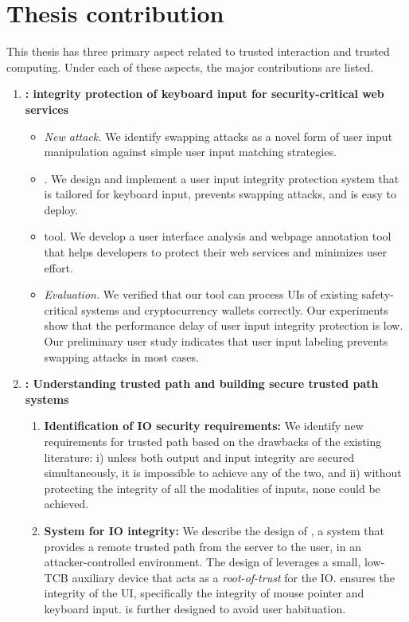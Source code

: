 \section{Thesis contribution} 

This thesis has three primary aspect related to trusted interaction and trusted computing. Under each of these aspects, the major contributions are listed.

\begin{enumerate}
  \item \textbf{\integrikey: integrity protection of keyboard input for security-critical web services}
\begin{itemize}
    \item \emph{New attack.} We identify swapping attacks as a novel form of user input manipulation against simple user input matching strategies.
    \item \interikey. We design and implement a user input integrity protection system that is tailored for keyboard input, prevents swapping attacks, and is easy to deploy.
    \item \interikey{} tool. We develop a user interface analysis and webpage annotation tool that helps developers to protect their web services and minimizes user effort.
    \item \emph{Evaluation.} We verified that our tool can process UIs of existing safety-critical systems and cryptocurrency wallets correctly. Our experiments show that the performance delay of \interikey user input integrity protection is low. Our preliminary user study indicates that user input labeling prevents swapping attacks in most cases.
\end{itemize}



    \item \textbf{\protection: Understanding trusted path and building secure trusted path systems}
    \begin{enumerate}
        \item  \textbf{Identification of IO security requirements:} We identify new requirements for trusted path based on the drawbacks of the existing literature: i) unless both output and input integrity are secured simultaneously, it is impossible to achieve any of the two, and ii) without protecting the integrity of all the modalities of inputs, none could be achieved.
        
        \item \textbf{System for IO integrity:} We describe the design of \protection, a system that provides a remote trusted path from the server to the user, in an attacker-controlled environment. The design of \protection leverages a small, low-TCB auxiliary device that acts as a \emph{root-of-trust} for the IO. \protection ensures the integrity of the UI, specifically the integrity of mouse pointer and keyboard input. \protection is further designed to avoid user habituation.
        

\end{enumerate}
\end{enumerate}
